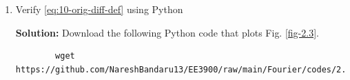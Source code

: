 \documentclass[journal,12pt,twocolumn]{IEEEtran}
\newcommand{\solution}{\noindent \textbf{Solution: }}
\providecommand{\brak}[1]{\ensuremath{\left(#1\right)}}
\providecommand{\cbrak}[1]{\ensuremath{\left\{#1\right\}}}
\providecommand{\sbrak}[1]{\ensuremath{\left[#1\right]}}
\providecommand{\der}[1]{\mathrm{d} #1}
\providecommand{\abs}[1]{\left\vert#1\right\vert}
\numberwithin{equation}{section}
\numberwithin{figure}{section}
\renewcommand\thesection{\arabic{section}}
\begin{document}
\begin{enumerate}[label=\thesection.\arabic*,ref=\thesection.\theenumi]
	\solution
	\begin{align}
		c_k = f_0\int_{-\frac{1}{2f_0}}^{\frac{1}{2f_0}}A_0\abs{\sin\brak{2\pi f_0 t}}e^{-\j2\pi kf_0 t}\, \der{t}
	\end{align}
	\begin{multline}
		c_k = f_0\int_{-\frac{1}{2f_0}}^{0}A_0\brak{-\sin\brak{2\pi f_0 t}}e^{-\j2\pi kf_0 t}\, \der{t} \\ +f_0\int_{0}^{\frac{1}{2f_0}}A_0\brak{\sin\brak{2\pi f_0 t}}e^{-\j2\pi kf_0 t}\, \der{t}
	\end{multline}
	\begin{multline}
		c_k = f_0\int_{0}^{\frac{1}{2f_0}}A_0\sin\brak{2\pi f_0 u}e^{\j2\pi kf_0 u}\, \der{t} \\ +f_0\int_{0}^{\frac{1}{2f_0}}A_0\sin\brak{2\pi f_0 t}e^{-\j2\pi kf_0 t}\, \der{t}
	\end{multline}
	\begin{align}
		c_k &= f_0 \int_{0}^{\frac{1}{2f_0}} A_0\sin\brak{2\pi f_0 t} \brak{e^{\j2\pi kf_0 t} + e^{-\j2\pi kf_0 t}} \,\der{t} \\
		&= f_0A_0 \int_{0}^{\frac{1}{2f_0}} 2\sin\brak{2\pi f_0 t} \cos\brak{2\pi k f_0 t} \,\der{t} \\
		&= f_0A_0 \int_{0}^{\frac{1}{2f_0}} \cbrak{\sin\brak{2\pi(1+k)f_0t} + \sin\brak{2\pi(1-k)f_0t}} \,\der{t} \\
		&= f_0A_0 \sbrak{-\frac{\cos\brak{2\pi(1+k)f_0t}}{2\pi(1+k)f_0} - \frac{\cos\brak{2\pi(1-k)f_0t}}{2\pi(1-k)f_0}}_0^{\frac{1}{2f_0}} \\
		&= \frac{f_0A_0}{2\pi f_0} \sbrak{\frac{1-(-1)^{1+k}}{1+k} + \frac{1-(-1)^{1-k}}{1-k}} \\
		&= \brak{1 + (-1)^k} \frac{A_0}{2\pi} \sbrak{\frac{1}{1+k} + \frac{1}{1-k}} \\
		&= \brak{1 + (-1)^k} \frac{A_0}{\pi(1-k^2)}
	\end{align}
	
	Therefore
	\begin{align}
		c_k = 
		\begin{cases}
			\frac{2A_0}{\pi(1-k^2)} & k \text{ is even} \\
			0 & k \text{ is odd} 
		\end{cases}
	\end{align}
	
	\item Verify \eqref{eq:10-orig-diff-def} using Python
	
	\solution Download the following Python code that plots Fig. \ref{fig-2.3}.
	\begin{lstlisting}
		wget https://github.com/NareshBandaru13/EE3900/raw/main/Fourier/codes/2.3.py
	\end{lstlisting}
	

\end{enumerate}
\end{document}
